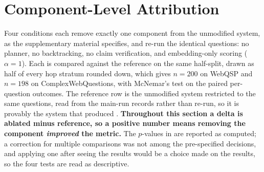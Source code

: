 %
%
%
%
%

\section{Component-Level Attribution}\label{sec:attribution}

Four conditions each remove exactly one component from the unmodified
system, as the supplementary material specifies, and re-run the
identical questions: no planner, no backtracking, no claim verification,
and embedding-only scoring ($\alpha = 1$). Each is compared against the
reference on the same half-split, drawn as half of every hop stratum
rounded down, which gives $n = 200$ on WebQSP and $n = 198$ on
ComplexWebQuestions, with McNemar's test on the paired per-question
outcomes. The reference row is the unmodified system restricted to the
same questions, read from the main-run records rather than re-run, so it
is provably the system that produced . \textbf{Throughout
this section a delta is ablated minus reference, so a positive number
means removing the component \emph{improved} the metric.} The $p$-values
in  are reported as computed; a correction for
multiple comparisons was not among the pre-specified decisions, and
applying one after seeing the results would be a choice made on the
results, so the four tests are read as descriptive.

